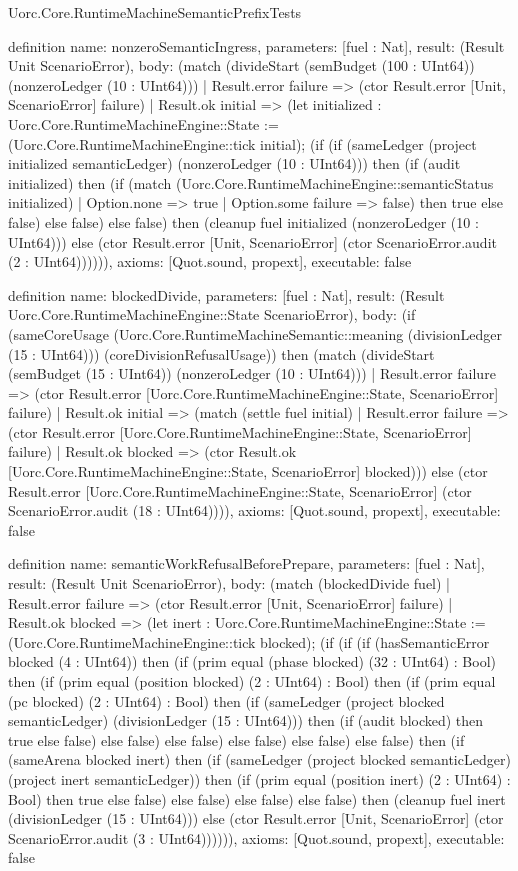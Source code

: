 \begin{lexlean}{Uorc.Core.RuntimeMachineSemanticPrefixTests}
\begin{semanticmodule}
definition{
  name: nonzeroSemanticIngress,
  parameters: [fuel : Nat],
  result: (Result Unit ScenarioError),
  body: (match (divideStart (semBudget (100 : UInt64)) (nonzeroLedger (10 : UInt64)))
    | Result.error failure => (ctor Result.error [Unit, ScenarioError] failure)
    | Result.ok initial => (let initialized : Uorc.Core.RuntimeMachineEngine::State := (Uorc.Core.RuntimeMachineEngine::tick initial); (if (if (sameLedger (project initialized semanticLedger) (nonzeroLedger (10 : UInt64))) then (if (audit initialized) then (if (match (Uorc.Core.RuntimeMachineEngine::semanticStatus initialized)
      | Option.none => true
      | Option.some failure => false) then true else false) else false) else false) then (cleanup fuel initialized (nonzeroLedger (10 : UInt64))) else (ctor Result.error [Unit, ScenarioError] (ctor ScenarioError.audit (2 : UInt64)))))),
  axioms: [Quot.sound, propext],
  executable: false
}

definition{
  name: blockedDivide,
  parameters: [fuel : Nat],
  result: (Result Uorc.Core.RuntimeMachineEngine::State ScenarioError),
  body: (if (sameCoreUsage (Uorc.Core.RuntimeMachineSemantic::meaning (divisionLedger (15 : UInt64))) (coreDivisionRefusalUsage)) then (match (divideStart (semBudget (15 : UInt64)) (nonzeroLedger (10 : UInt64)))
    | Result.error failure => (ctor Result.error [Uorc.Core.RuntimeMachineEngine::State, ScenarioError] failure)
    | Result.ok initial => (match (settle fuel initial)
      | Result.error failure => (ctor Result.error [Uorc.Core.RuntimeMachineEngine::State, ScenarioError] failure)
      | Result.ok blocked => (ctor Result.ok [Uorc.Core.RuntimeMachineEngine::State, ScenarioError] blocked))) else (ctor Result.error [Uorc.Core.RuntimeMachineEngine::State, ScenarioError] (ctor ScenarioError.audit (18 : UInt64)))),
  axioms: [Quot.sound, propext],
  executable: false
}

definition{
  name: semanticWorkRefusalBeforePrepare,
  parameters: [fuel : Nat],
  result: (Result Unit ScenarioError),
  body: (match (blockedDivide fuel)
    | Result.error failure => (ctor Result.error [Unit, ScenarioError] failure)
    | Result.ok blocked => (let inert : Uorc.Core.RuntimeMachineEngine::State := (Uorc.Core.RuntimeMachineEngine::tick blocked); (if (if (if (hasSemanticError blocked (4 : UInt64)) then (if (prim equal (phase blocked) (32 : UInt64) : Bool) then (if (prim equal (position blocked) (2 : UInt64) : Bool) then (if (prim equal (pc blocked) (2 : UInt64) : Bool) then (if (sameLedger (project blocked semanticLedger) (divisionLedger (15 : UInt64))) then (if (audit blocked) then true else false) else false) else false) else false) else false) else false) then (if (sameArena blocked inert) then (if (sameLedger (project blocked semanticLedger) (project inert semanticLedger)) then (if (prim equal (position inert) (2 : UInt64) : Bool) then true else false) else false) else false) else false) then (cleanup fuel inert (divisionLedger (15 : UInt64))) else (ctor Result.error [Unit, ScenarioError] (ctor ScenarioError.audit (3 : UInt64)))))),
  axioms: [Quot.sound, propext],
  executable: false
}


\end{semanticmodule}
\end{lexlean}
